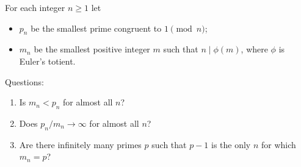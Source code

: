 For each integer $n\ge 1$ let
\begin{itemize}
\item $p_n$ be the smallest prime congruent to $1\pmod n$;
\item $m_n$ be the smallest positive integer $m$ such that $n\mid \phi(m)$, where $\phi$ is Euler's totient.
\end{itemize}
Questions:
\begin{enumerate}
\item Is $m_n<p_n$ for almost all $n$?
\item Does $p_n/m_n\to\infty$ for almost all $n$?
\item Are there infinitely many primes $p$ such that $p-1$ is the only $n$ for which $m_n=p$?
\end{enumerate}
